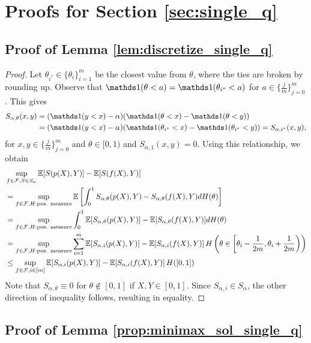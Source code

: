\section{Proofs for Section \ref{sec:single_q}} 

\subsection{Proof of Lemma \ref{lem:discretize_single_q}} \label{pf:discretize_single_q}
\begin{proof}
  Let $\theta_{i^*} \in \{\theta_i\}_{i=1}^{m}$ be the closest value  from $\theta$, where the ties are broken by rounding up. Observe that $\one(\theta < a) = \one(\theta_{i^*} < a)$ for $a \in \{\frac{j}{m}\}_{j=0}^m$. This gives 
  \begin{align*}
  S_{\alpha, \theta}(x,y) & = (\one(y<x)-\alpha)(\one(\theta<x)-\one(\theta<y)) \\
  & = (\one(y<x)-\alpha)(\one(\theta_{i^*}<x)-\one(\theta_{i^*}<y)) = S_{\alpha, {i^*}}(x,y),
  \end{align*}
  for $x,y \in \{\frac{j}{m}\}_{j=0}^m$ and $\theta \in [0,1)$ and $S_{\alpha, 1}(x,y) = 0$. Using this relationship, we obtain
  \begin{align*}
  & \sup_{f\in\mathcal{F}, S\in S_\alpha} \mathbb{E}[S(p(X),Y)] - \mathbb{E}[S(f(X),Y)] \\
  &= \sup_{f\in\mathcal{F}, H:\text{pos. measure}} \mathbb{E}\left[\int_0^1 S_{\alpha, \theta}(p(X), Y) - S_{\alpha, \theta}(f(X),Y) dH(\theta) \right] \\
  &= \sup_{f\in\mathcal{F}, H:\text{pos. measure}} \int_0^1\mathbb{E}[S_{\alpha, \theta}(p(X), Y)] - \mathbb{E}[S_{\alpha, \theta}(f(X),Y)] dH(\theta)\\
  &= \sup_{f\in\mathcal{F}, H:\text{pos. measure}} \sum_{i=1}^{m} \mathbb{E}[S_{{\alpha, i}}(p(X), Y)] - \mathbb{E}[S_{{\alpha, i}}(f(X),Y)] \, 
  H\left(\theta \in \left[\theta_i-\frac{1}{2m}, \theta_i +\frac{1}{2m}\right)\right) \\
  &\leq \sup_{f\in\mathcal{F}, i\in[m]} \mathbb{E}[S_{{\alpha, i}}(p(X), Y)] - \mathbb{E}[S_{{\alpha, i}}(f(X),Y)] \, H([0,1])
  \end{align*}
  Note that $S_{\alpha, \theta} \equiv 0$ for $\theta \notin [0,1]$ if $X,Y \in [0,1]$. 
  Since $S_{\alpha, i} \in S_\alpha$, the other direction of inequality follows, resulting in equality.
\end{proof}


\subsection{Proof of Lemma \ref{prop:minimax_sol_single_q}} \label{pf:minimax_sol_single_q}

